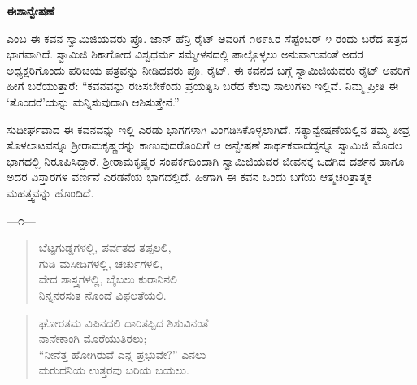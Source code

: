 

\selectkan

\begin{center}
\textbf{ಈಶಾನ್ವೇಷಣೆ}
\end{center}

 ಎಂಬ ಈ ಕವನ ಸ್ವಾಮಿಜಿಯವರು ಪ್ರೊ. ಜಾನ್ ಹೆನ್ರಿ ರೈಟ್ ಅವರಿಗೆ ೧೮೯೩ರ ಸೆಪ್ಟೆಂಬರ್ ೪ ರಂದು ಬರೆದ ಪತ್ರದ ಭಾಗವಾಗಿದೆ. ಸ್ವಾಮಿಜಿ ಶಿಕಾಗೋದ ವಿಶ್ವಧರ್ಮ ಸಮ್ಮೇಳನದಲ್ಲಿ ಪಾಲ್ಗೊಳ್ಳಲು ಅನುವಾಗುವಂತೆ ಅದರ ಅಧ್ಯಕ್ಷರಿಗೊಂದು ಪರಿಚಯ ಪತ್ರವನ್ನು ನೀಡಿದವರು ಪ್ರೊ. ರೈಟ್. ಈ ಕವನದ ಬಗ್ಗೆ ಸ್ವಾಮಿಜಿಯವರು ರೈಟ್ ಅವರಿಗೆ ಹೀಗೆ ಬರೆಯುತ್ತಾರೆ: “ಕವನವನ್ನು ರಚಿಸಬೇಕೆಂದು ಪ್ರಯತ್ನಿಸಿ ಬರೆದ ಕೆಲವು ಸಾಲುಗಳು ಇಲ್ಲಿವೆ. ನಿಮ್ಮ ಪ್ರೀತಿ ಈ ‘ತೊಂದರೆ’ಯನ್ನು ಮನ್ನಿಸುವುದಾಗಿ ಆಶಿಸುತ್ತೇನೆ.”

ಸುದೀರ್ಘವಾದ ಈ ಕವನವನ್ನು ಇಲ್ಲಿ ಎರಡು ಭಾಗಗಳಾಗಿ ವಿಂಗಡಿಸಿಕೊಳ್ಳಲಾಗಿದೆ. ಸತ್ಯಾನ್ವೇಷಣೆಯಲ್ಲಿನ ತಮ್ಮ ತೀವ್ರ ತೊಳಲಾಟವನ್ನೂ ಶ‍್ರೀರಾಮಕೃಷ್ಣರನ್ನು ಕಾಣುವುದರೊಂದಿಗೆ ಆ ಅನ್ವೇಷಣೆ ಸಾರ್ಥಕವಾದದ್ದನ್ನೂ ಸ್ವಾಮಿಜಿ ಮೊದಲ ಭಾಗದಲ್ಲಿ ನಿರೂಪಿಸಿದ್ದಾರೆ. ಶ‍್ರೀರಾಮಕೃಷ್ಣರ ಸಂಪರ್ಕದಿಂದಾಗಿ ಸ್ವಾಮಿಜಿಯವರ ಜೀವನಕ್ಕೆ ಒದಗಿದ ದರ್ಶನ ಹಾಗೂ ಅದರ ವಿಸ್ತಾರಗಳ ವರ್ಣನೆ ಎರಡನೆಯ ಭಾಗದಲ್ಲಿದೆ. ಹೀಗಾಗಿ ಈ ಕವನ ಒಂದು ಬಗೆಯ ಆತ್ಮಚರಿತ್ರಾತ್ಮಕ ಮಹತ್ತ್ವವನ್ನು ಹೊಂದಿದೆ.

\begin{center}
—೧—
\end{center}

\begin{verse}
ಬೆಟ್ಟಗುಡ್ಡಗಳಲ್ಲಿ, ಪರ್ವತದ ತಪ್ಪಲಲಿ,\\ಗುಡಿ ಮಸೀದಿಗಳಲ್ಲಿ, ಚರ್ಚುಗಳಲಿ,\\ವೇದ ಶಾಸ್ತ್ರಗಳಲ್ಲಿ, ಬೈಬಲು ಕುರಾನಿನಲಿ\\ನಿನ್ನನರಸುತ ನೊಂದೆ ವಿಫಲತೆಯಲಿ.
\end{verse}

\begin{verse}
ಘೋರತಮ ವಿಪಿನದಲಿ ದಾರಿತಪ್ಪಿದ ಶಿಶುವಿನಂತೆ\\ನಾನೇಕಾಂಗಿ ಮೊರೆಯುತಿರಲು;\\“ನೀನೆತ್ತ ಹೋಗಿರುವೆ ಎನ್ನ ಪ್ರಭುವೇ?” ಎನಲು\\ಮರುದನಿಯ ಉತ್ತರವು ಬರಿಯ ಬಯಲು.
\end{verse}

